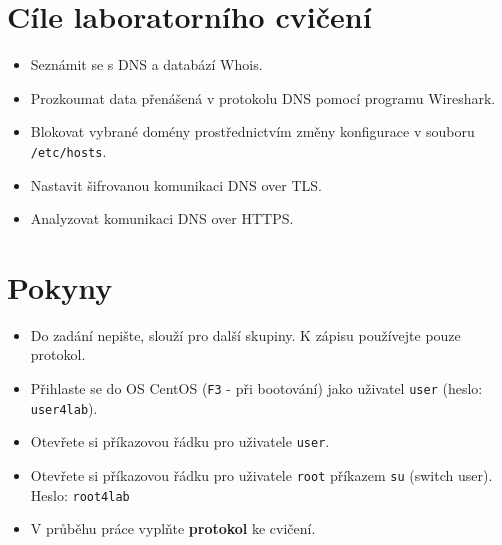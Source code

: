 \section*{Cíle laboratorního cvičení}
\begin{itemize}
  \item Seznámit se s DNS a databází Whois.
  \item Prozkoumat data přenášená v protokolu DNS pomocí programu Wireshark.
  \item Blokovat vybrané domény prostřednictvím změny konfigurace v souboru \texttt{/etc/hosts}.
  \item Nastavit šifrovanou komunikaci DNS over TLS.
  \item Analyzovat komunikaci DNS over HTTPS.
\end{itemize}

\section*{Pokyny}
\begin{itemize}
  \item Do zadání nepište, slouží pro další skupiny. K zápisu používejte pouze protokol.
  \item Přihlaste se do OS CentOS (\texttt{F3} - při bootování) jako uživatel \texttt{user} (heslo: \texttt{user4lab}).
  \item Otevřete si příkazovou řádku pro uživatele {\tt user}.
  \item Otevřete si příkazovou řádku pro uživatele {\tt root} příkazem {\tt su} (switch user). Heslo: \texttt{root4lab}
  \item V průběhu práce vyplňte \textbf{protokol} ke cvičení.
\end{itemize}

